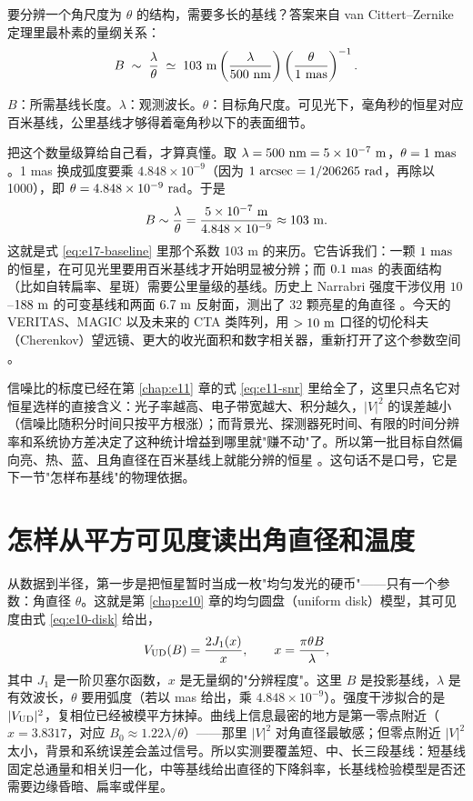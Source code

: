 要分辨一个角尺度为 \(\theta\) 的结构，需要多长的基线？答案来自 van Cittert--Zernike 定理里最朴素的量纲关系：
\begin{equation}
  B \;\sim\; \frac{\lambda}{\theta}
  \;\simeq\; 103~{\rm m}
  \left(\frac{\lambda}{500~{\rm nm}}\right)
  \left(\frac{\theta}{1~{\rm mas}}\right)^{-1}.
  \label{eq:e17-baseline}
\end{equation}
\begin{formulaexplain}
\(B\)：所需基线长度。\(\lambda\)：观测波长。\(\theta\)：目标角尺度。可见光下，毫角秒的恒星对应百米基线，公里基线才够得着毫角秒以下的表面细节。
\end{formulaexplain}
把这个数量级算给自己看，才算真懂。取 \(\lambda=500~{\rm nm}=5\times10^{-7}~{\rm m}\)，\(\theta=1~{\rm mas}\)。1 mas 换成弧度要乘 \(4.848\times10^{-9}\)（因为 \(1~{\rm arcsec}=1/206265~{\rm rad}\)，再除以 1000），即 \(\theta=4.848\times10^{-9}~{\rm rad}\)。于是
\[
  B\sim\frac{\lambda}{\theta}=\frac{5\times10^{-7}~{\rm m}}{4.848\times10^{-9}}
  \approx 103~{\rm m}.
\]
这就是式 \eqref{eq:e17-baseline} 里那个系数 103 m 的来历。它告诉我们：一颗 \(1~{\rm mas}\) 的恒星，在可见光里要用百米基线才开始明显被分辨；而 \(0.1~{\rm mas}\) 的表面结构（比如自转扁率、星斑）需要公里量级的基线。历史上 Narrabri 强度干涉仪用 \(10\)--\(188~{\rm m}\) 的可变基线和两面 \(6.7~{\rm m}\) 反射面，测出了 32 颗亮星的角直径 \citep{1974MNRAS.167..121H,1974iiia.book.....H}。今天的 VERITAS、MAGIC 以及未来的 CTA 类阵列，用 \(>10~{\rm m}\) 口径的切伦科夫（Cherenkov）望远镜、更大的收光面积和数字相关器，重新打开了这个参数空间 \citep{2020NatAs...4.1164A,2024MNRAS.529.4387A}。

信噪比的标度已经在第 \ref{chap:e11} 章的式 \eqref{eq:e11-snr} 里给全了，这里只点名它对恒星选样的直接含义：光子率越高、电子带宽越大、积分越久，\(|V|^2\) 的误差越小（信噪比随积分时间只按平方根涨）；而背景光、探测器死时间、有限的时间分辨率和系统协方差决定了这种统计增益到哪里就"赚不动"了。所以第一批目标自然偏向亮、热、蓝、且角直径在百米基线上就能分辨的恒星 \citep{2013MNRAS.430.3187R,2020NatAs...4.1164A}。这句话不是口号，它是下一节"怎样布基线"的物理依据。

\section{怎样从平方可见度读出角直径和温度}
\label{sec:e17-diameter-teff}

从数据到半径，第一步是把恒星暂时当成一枚"均匀发光的硬币"——只有一个参数：角直径 \(\theta\)。这就是第 \ref{chap:e10} 章的均匀圆盘（uniform disk）模型，其可见度由式 \eqref{eq:e10-disk} 给出，
\[
  V_{\rm UD}(B)=\frac{2J_1(x)}{x},\qquad x=\frac{\pi\theta B}{\lambda},
\]
其中 \(J_1\) 是一阶贝塞尔函数，\(x\) 是无量纲的"分辨程度"。这里 \(B\) 是投影基线，\(\lambda\) 是有效波长，\(\theta\) 要用弧度（若以 mas 给出，乘 \(4.848\times10^{-9}\)）。强度干涉拟合的是 \(|V_{\rm UD}|^2\)，复相位已经被模平方抹掉。曲线上信息最密的地方是第一零点附近（\(x=3.8317\)，对应 \(B_0\approx1.22\lambda/\theta\)）——那里 \(|V|^2\) 对角直径最敏感；但零点附近 \(|V|^2\) 太小，背景和系统误差会盖过信号。所以实测要覆盖短、中、长三段基线：短基线固定总通量和相关归一化，中等基线给出直径的下降斜率，长基线检验模型是否还需要边缘昏暗、扁率或伴星。

